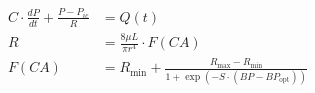 \documentclass[preview, border=5pt]{standalone}
\begin{document}
\Large %
\begin{equation*}
\begin{aligned}
C \cdot \frac{dP}{dt} + \frac{P - P_{ic}}{R} &= Q(t) \\
R &= \frac{8 \mu L}{\pi r^4} \cdot F(CA) \\
F(CA) &= R_{\text{min}} + \frac{R_{\text{max}} - R_{\text{min}}}{1 + \exp\left(-S \cdot (BP - BP_{\text{opt}})\right)}
\end{aligned}
\end{equation*}
\end{document}
